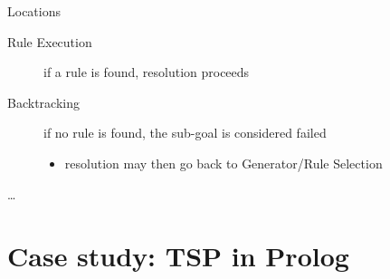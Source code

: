 \documentclass[presentation]{beamer}
\begin{document}
\begin{frame}[allowframebreaks]
\begin{block}{Locations}
\begin{description}
            \item[\textsf{Rule Execution}] if a rule is found, resolution proceeds 
            
            \item[\textsf{Backtracking}] if no rule is found, the sub-goal is considered failed 
            \begin{itemize}
                \item resolution may then go back to \textsf{Generator/Rule Selection}
            \end{itemize}

            \item[\ldots]
        \end{description}
    \end{block}

    \hfill{}

\end{frame}

\section{Case study: TSP in Prolog}
\end{document}
